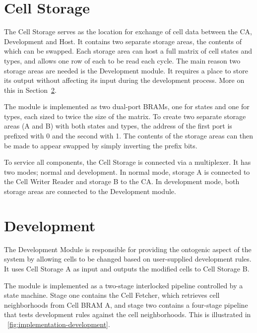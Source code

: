 
\section{Cell Storage}


The Cell Storage serves as the location for exchange of cell data between the CA, Development and Host.
It contains two separate storage areas, the contents of which can be swapped.
Each storage area can host a full matrix of cell states and types, and allows one row of each to be read each cycle.
The main reason two storage areas are needed is the Development module.
It requires a place to store its output without affecting its input during the development process.
More on this in Section~\ref{sec:development}.

The module is implemented as two dual-port BRAMs, one for states and one for types, each sized to twice the size of the matrix.
To create two separate storage areas (A and B) with both states and types, the address of the first port is prefixed with 0 and the second with 1.
The contents of the storage areas can then be made to appear swapped by simply inverting the prefix bits.

To service all  components, the Cell Storage is connected via a multiplexer.
It has two modes; normal and development.
In normal mode, storage A is connected to the Cell Writer Reader and storage B to the CA.
In development mode, both storage areas are connected to the Development module.



\section{Development}
\label{sec:development}

The Development Module is responsible for providing the ontogenic aspect of the system by allowing cells to be changed based on user-supplied development rules.
It uses Cell Storage A as input and outputs the modified cells to Cell Storage B.

The module is implemented as a two-stage interlocked pipeline controlled by a state machine.
Stage one contains the Cell Fetcher, which retrieves cell neighborhoods from Cell BRAM A, and stage two contains a four-stage pipeline that tests development rules against the cell neighborhoods.
This is illustrated in \figurename~\ref{fig:implementation-development}.

